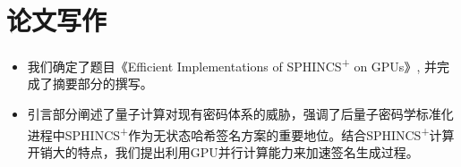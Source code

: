 \documentclass[11pt,a4paper]{article}
\begin{document}
\noindent

\section{论文写作}
\begin{itemize}
\item 我们确定了题目《Efficient Implementations of SPHINCS\textsuperscript{+} on GPUs》, 并完成了摘要部分的撰写。
\item 引言部分阐述了量子计算对现有密码体系的威胁，强调了后量子密码学标准化进程中SPHINCS\textsuperscript{+}作为无状态哈希签名方案的重要地位。结合SPHINCS\textsuperscript{+}计算开销大的特点，我们提出利用GPU并行计算能力来加速签名生成过程。
\end{itemize}



\end{document}
